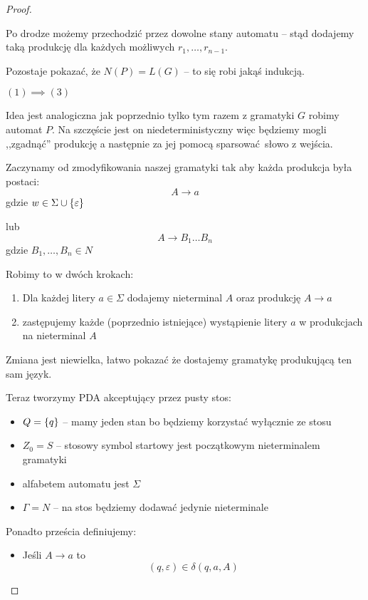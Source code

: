 \begin{proof}
\begin{description}
		      Po drodze możemy przechodzić przez dowolne stany automatu -- stąd dodajemy taką produkcję dla każdych możliwych \( r_1, \dots, r_{n-1} \).


		      Pozostaje pokazać, że \( N(P) = L(G) \) -- to się robi jakąś indukcją.


		\item \( (1) \implies (3) \)

		      Idea jest analogiczna jak poprzednio tylko tym razem z gramatyki \( G \) robimy automat \( P \). Na szczęście jest on niedeterministyczny więc będziemy mogli ,,zgadnąć'' produkcję a następnie za jej pomocą sparsować słowo z wejścia.


		      Zaczynamy od zmodyfikowania naszej gramatyki tak aby każda produkcja była postaci:
		      \[
			      A \rightarrow a
		      \]
		      gdzie \( w \in \Sigma \cup \set{\varepsilon} \)

		      lub
		      \[
			      A \rightarrow B_1 \dots B_n
		      \]
		      gdzie \( B_1, \dots, B_n \in N \)

		      Robimy to w dwóch krokach:
		      \begin{enumerate}
			      \item Dla każdej litery \( a \in \Sigma \) dodajemy nieterminal \( A \) oraz produkcję \( A \rightarrow a \)
			      \item zastępujemy każde (poprzednio istniejące) wystąpienie litery \( a \) w produkcjach na nieterminal \( A \)
		      \end{enumerate}

		      Zmiana jest niewielka, łatwo pokazać że dostajemy gramatykę produkującą ten sam język.



		      Teraz tworzymy PDA akceptujący przez pusty stos:
		      \begin{itemize}
			      \item \( Q = \set{q} \) -- mamy jeden stan bo będziemy korzystać wyłącznie ze stosu
			      \item \( Z_0 = S \) -- stosowy symbol startowy jest początkowym nieterminalem gramatyki
			      \item alfabetem automatu jest \( \Sigma \)
			      \item \( \Gamma = N \) -- na stos będziemy dodawać jedynie nieterminale
		      \end{itemize}

		      Ponadto prześcia definiujemy:
		      \begin{itemize}
			      \item Jeśli \( A \rightarrow a \) to
			            \[
				            (q, \varepsilon) \in \delta(q, a, A)
			            \]


\end{itemize}
\end{description}
\end{proof}
